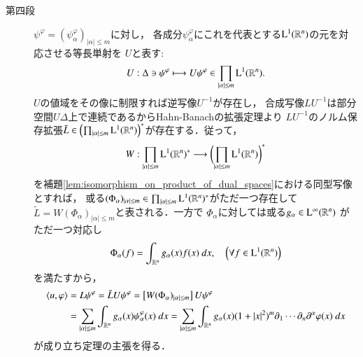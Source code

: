 \begin{prf}
\begin{description}
			\item[第四段]
				$\psi^\varphi = (\psi^\varphi_\alpha)_{|\alpha| \leq m}$に対し，
				各成分$\psi^\varphi_\alpha$にこれを代表とする$\mathrm{L}^1(\mathbb{R}^n)$の元を対応させる等長単射を
				$U$と表す:
				\begin{align}
					U:\Delta \ni \psi^\varphi \longmapsto 
					U \psi^\varphi \in \prod_{|\alpha| \leq m} \mathrm{L}^1(\mathbb{R}^n).
				\end{align}
				$U$の値域をその像に制限すれば逆写像$U^{-1}$が存在し，
				合成写像$LU^{-1}$は部分空間$U\Delta$上で連続であるからHahn-Banachの拡張定理より
				$LU^{-1}$のノルム保存拡張$\tilde{L} \in \left( \prod_{|\alpha| \leq m} \mathrm{L}^1(\mathbb{R}^n) \right)^*$が存在する．従って，
				\begin{align}
					W:\prod_{|\alpha| \leq m} \mathrm{L}^1(\mathbb{R}^n)^* \longrightarrow 
					\biggl( \prod_{|\alpha| \leq m} \mathrm{L}^1(\mathbb{R}^n) \biggr)^*
				\end{align}
				を補題\ref{lem:isomorphism_on_product_of_dual_spaces}における同型写像とすれば，
				或る$(\Phi_\alpha)_{|\alpha| \leq m} \in \prod_{|\alpha| \leq m} \mathrm{L}^1(\mathbb{R}^n)^*$がただ一つ存在して$\tilde{L} = W (\Phi_\alpha)_{|\alpha| \leq m}$と表される．一方で
				$\Phi_\alpha$に対しては或る$g_\alpha \in \mathrm{L}^\infty(\mathbb{R}^n)$
				がただ一つ対応し
				\begin{align}
					\Phi_\alpha (f) = \int_{\mathbb{R}^n} g_\alpha(x)f(x)\ dx,
					\quad \left( \forall f \in \mathrm{L}^1(\mathbb{R}^n) \right)
				\end{align}
				を満たすから，
				\begin{align}
					\inprod<u,\varphi>
					&= L\psi^\varphi
					= \tilde{L}U\psi^\varphi
					= \left[ W(\Phi_\alpha)_{|\alpha| \leq m} \right] U\psi^\varphi \\
					&= \sum_{|\alpha| \leq m} \int_{\R^n} g_\alpha(x) \psi^\varphi_\alpha(x)\ dx
					= \sum_{|\alpha| \leq m} \int_{\R^n} g_\alpha(x) (1+|x|^2)^m \partial_1 \cdots \partial_n\partial^\alpha \varphi(x)\ dx
				\end{align}
				が成り立ち定理の主張を得る．
				\QED
		\end{description}
	\end{prf}